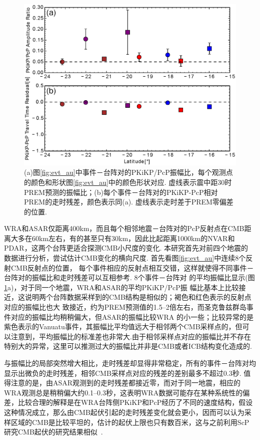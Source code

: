 \begin{figure}
\centering
\includegraphics[width=0.7\linewidth]{fig/chap3/au_ratio_tres}
\caption{(a)图\ref{fig:evt_au}中事件－台阵对的PKiKP/PcP振幅比，每个观测点的颜色和形状图\ref{fig:evt_au}中的颜色形状对应. 虚线表示震中距30{\textdegree}时PREM预测的振幅比；(b)每个事件－台阵对的PKiKP-PcP相对PREM的走时残差，颜色表示同(a). 虚线表示走时差于PREM零偏差的位置. }
\label{fig:au_ratio_tres}
\end{figure}

WRA和ASAR仅距离400km，而且每个相邻地震－台阵对的PcP反射点在CMB距离大多在60km左右，有的甚至只有30km，因此比起距离1000km的NVAR和PDAR，这两个台阵更适合探测CMB小尺度的变化. 本研究首先对前四个地震的
数据进行分析，尝试估计CMB变化的横向尺度. 首先看图\ref{fig:evt_au}中连续8个反射CMB反射点的位置，
每个事件相应的反射点相互交错，这样就使得不同事件－台阵对的振幅比和走时残差可以互相参考. 8个事件－台阵对
的平均振幅比显示(图\ref{fig:au_ratio_tres}a)，对于同一个地震，WRA和ASAR的平均PKiKP/PcP振
幅比基本上比较接近，这说明两个台阵数据采样到的CMB结构是相似的；褐色和红色表示的反射点对应的振幅比也大
致接近，约为PREM预测值的1.5--2倍左右，而圣克鲁兹群岛事件对应的振幅比均稍稍偏大，但ASAR的振幅比较WRA
的小一些；比较异常的是紫色表示的Vanuatu事件，其振幅比平均值远大于相邻两个CMB采样点的，但可以注意到，平均振幅比的标准差也非常大.由于相邻采样点对应的振幅比并不存在特别大的异常，这里可以推测过大的振幅比并非是CMB或者ICB结构变化造成的. 

与振幅比的局部突然增大相比，走时残差却显得非常稳定，所有的事件－台阵对均显示出微负的走时残差，相邻CMB采样点对应的残差的差别最多不超过0.3秒. 值得注意的是，由ASAR观测到的走时残差都接近零，而对于同一地震，相应的WRA观测总是稍稍偏大约0.1--0.3秒，这表明WRA数据可能存在某种系统性的偏差，比较合理的解释是在WRA台阵侧PKiKP和PcP经历了不同的速度结构，假设这种情况成立，那么由CMB起伏引起的走时残差变化就会更小，因而可以认为采样区域的CMB是比较平坦的，估计的起伏上限也只有数百米，这与之前利用ScP研究CMB起伏的研究结果相似~\citep{Vidale1992a}. 

